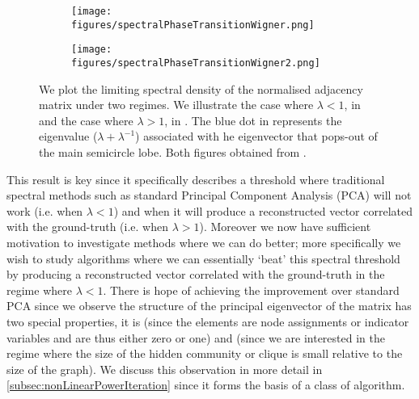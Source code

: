 \begin{figure}
	\centering
	\begin{subfigure}{.5\textwidth}
		\centering
		\texttt{[image: figures/spectralPhaseTransitionWigner.png]}
		\caption{}
		\label{fig:spectralPhaseTransitionWigner}
	\end{subfigure}%
	\begin{subfigure}{.5\textwidth}
		\centering
		\texttt{[image: figures/spectralPhaseTransitionWigner2.png]}
		\caption{}
		\label{fig:spectralPhaseTransitionWigner2}
	\end{subfigure}
	\caption[Plots illustrating spectral phase transition of Wigner Matrices.]{\label{fig:spectralPhaseTransitionWignerPlots} We plot the limiting spectral density of the normalised adjacency matrix under two regimes. We illustrate the case where $\lambda < 1$, in  and the case where $\lambda > 1$, in . The blue dot in  represents the eigenvalue ($\lambda + \lambda^{-1}$) associated with he eigenvector that pops-out of the main semicircle lobe. Both figures obtained from \cite{Mon13}.}
\end{figure}

This result is key since it specifically describes a threshold where traditional spectral methods such as standard Principal Component Analysis (PCA) will not work (i.e. when $\lambda < 1$) and when it will produce a reconstructed vector correlated with the ground-truth (i.e. when $\lambda > 1$).
Moreover we now have sufficient motivation to investigate methods where we can do better; more specifically we wish to study algorithms where we can essentially `beat' this spectral threshold by producing a reconstructed vector correlated with the ground-truth in the regime where $\lambda < 1$.
There is hope of achieving the improvement over standard PCA since we observe the structure of the principal eigenvector of the matrix has two special properties, it is  (since the elements are node assignments or indicator variables and are thus either zero or one) and  (since we are interested in the regime where the size of the hidden community or clique is small relative to the size of the graph).
We discuss this observation in more detail in \cref{subsec:nonLinearPowerIteration} since it forms the basis of a class of algorithm.


